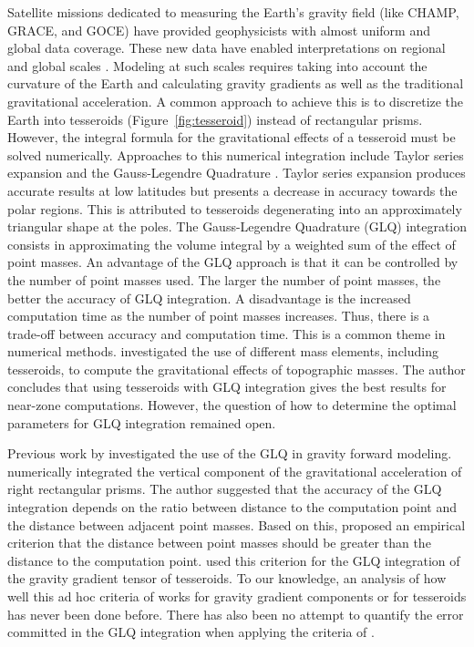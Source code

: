\documentclass[paper,twocolumn,twoside]{geophysics}
\begin{document}
Satellite missions dedicated to measuring the Earth's gravity field
(like CHAMP, GRACE, and GOCE)
have provided geophysicists with almost uniform and global data coverage.
These new data have enabled interpretations on regional and global scales
\citep[e.g.][]{Reguzzoni2013,Braitenberg2015}.
Modeling at such scales requires taking into account the curvature of the
Earth and calculating gravity gradients as well as the traditional
gravitational acceleration.
A common approach to achieve this is
to discretize the Earth into tesseroids (Figure~\ref{fig:tesseroid})
instead of rectangular prisms.
However, the integral formula for the gravitational effects of a tesseroid
must be solved numerically.
Approaches to this numerical integration include
Taylor series expansion \citep{Heck2007, Grombein2013}
and the Gauss-Legendre Quadrature \citep{Asgharzadeh2007}.
Taylor series expansion produces accurate results at low latitudes but
presents a decrease in accuracy towards the polar regions.
This is attributed to tesseroids degenerating into an approximately triangular
shape at the poles.
The Gauss-Legendre Quadrature (GLQ) integration consists in approximating
the volume integral by a weighted sum of the effect of point masses.
An advantage of the GLQ approach is that it can be
controlled by the number of point masses used.
The larger the number of point masses,
the better the accuracy of GLQ integration.
A disadvantage is the increased computation time as the number of
point masses increases.
Thus, there is a trade-off between accuracy and computation time.
This is a common theme in numerical methods.
\citet{Wild-Pfeiffer2008} investigated the use of different mass elements,
including tesseroids, to compute the gravitational effects of topographic
masses.
The author concludes that using tesseroids with GLQ integration gives the best
results for near-zone computations.
However, the question of how to determine the optimal parameters for GLQ
integration remained open.


Previous work by \citet{Ku1977} investigated the use of the GLQ
in gravity forward modeling.
\citet{Ku1977} numerically integrated the vertical component of the
gravitational acceleration of right rectangular prisms.
The author suggested that the accuracy of the GLQ integration depends on
the ratio between distance to the computation point and the distance between
adjacent point masses.
Based on this, \citet{Ku1977} proposed an empirical criterion that
the distance between point masses should be greater than
the distance to the computation point.
\citet{Asgharzadeh2007} used  this criterion for the GLQ integration of
the gravity gradient tensor of tesseroids.
To our knowledge, an analysis of how well this ad hoc criteria of
\citet{Ku1977} works for gravity gradient components or for tesseroids
has never been done before.
There has also been no attempt to quantify the error committed in the GLQ
integration when applying the criteria of \citet{Ku1977}.
\end{document}
